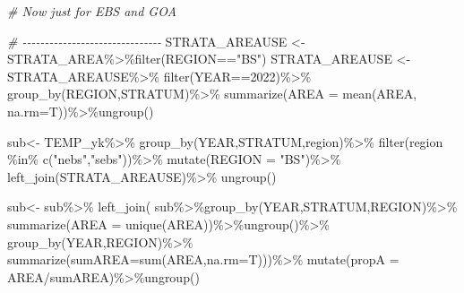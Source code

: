 \documentclass[
]{article}
\newenvironment{Shaded}{\begin{snugshade}}{\end{snugshade}}
\newcommand{\AttributeTok}[1]{\textcolor[rgb]{0.77,0.63,0.00}{#1}}
\newcommand{\CommentTok}[1]{\textcolor[rgb]{0.56,0.35,0.01}{\textit{#1}}}
\newcommand{\DecValTok}[1]{\textcolor[rgb]{0.00,0.00,0.81}{#1}}
\newcommand{\FunctionTok}[1]{\textcolor[rgb]{0.00,0.00,0.00}{#1}}
\newcommand{\NormalTok}[1]{#1}
\newcommand{\OtherTok}[1]{\textcolor[rgb]{0.56,0.35,0.01}{#1}}
\newcommand{\SpecialCharTok}[1]{\textcolor[rgb]{0.00,0.00,0.00}{#1}}
\newcommand{\StringTok}[1]{\textcolor[rgb]{0.31,0.60,0.02}{#1}}
\begin{document}
\begin{Shaded}
\begin{Highlighting}[]
  \CommentTok{\# Now just for EBS and GOA}
  
  \CommentTok{\# {-}{-}{-}{-}{-}{-}{-}{-}{-}{-}{-}{-}{-}{-}{-}{-}{-}{-}{-}{-}{-}{-}{-}{-}{-}{-}{-}{-}{-}{-}{-}}
\NormalTok{        STRATA\_AREAUSE }\OtherTok{\textless{}{-}}\NormalTok{ STRATA\_AREA}\SpecialCharTok{\%\textgreater{}\%}\FunctionTok{filter}\NormalTok{(REGION}\SpecialCharTok{==}\StringTok{"BS"}\NormalTok{)}
\NormalTok{        STRATA\_AREAUSE }\OtherTok{\textless{}{-}}\NormalTok{ STRATA\_AREAUSE}\SpecialCharTok{\%\textgreater{}\%}
          \FunctionTok{filter}\NormalTok{(YEAR}\SpecialCharTok{==}\DecValTok{2022}\NormalTok{)}\SpecialCharTok{\%\textgreater{}\%}
          \FunctionTok{group\_by}\NormalTok{(REGION,STRATUM)}\SpecialCharTok{\%\textgreater{}\%}
          \FunctionTok{summarize}\NormalTok{(}\AttributeTok{AREA =} \FunctionTok{mean}\NormalTok{(AREA, }\AttributeTok{na.rm=}\NormalTok{T))}\SpecialCharTok{\%\textgreater{}\%}\FunctionTok{ungroup}\NormalTok{()}
  
\NormalTok{  sub}\OtherTok{\textless{}{-}}\NormalTok{ TEMP\_yk}\SpecialCharTok{\%\textgreater{}\%}
    \FunctionTok{group\_by}\NormalTok{(YEAR,STRATUM,region)}\SpecialCharTok{\%\textgreater{}\%}
    \FunctionTok{filter}\NormalTok{(region }\SpecialCharTok{\%in\%} \FunctionTok{c}\NormalTok{(}\StringTok{"nebs"}\NormalTok{,}\StringTok{"sebs"}\NormalTok{))}\SpecialCharTok{\%\textgreater{}\%}
    \FunctionTok{mutate}\NormalTok{(}\AttributeTok{REGION =} \StringTok{"BS"}\NormalTok{)}\SpecialCharTok{\%\textgreater{}\%}
    \FunctionTok{left\_join}\NormalTok{(STRATA\_AREAUSE)}\SpecialCharTok{\%\textgreater{}\%}
    \FunctionTok{ungroup}\NormalTok{()}
  
\NormalTok{  sub}\OtherTok{\textless{}{-}}\NormalTok{ sub}\SpecialCharTok{\%\textgreater{}\%}
    \FunctionTok{left\_join}\NormalTok{(}
\NormalTok{      sub}\SpecialCharTok{\%\textgreater{}\%}\FunctionTok{group\_by}\NormalTok{(YEAR,STRATUM,REGION)}\SpecialCharTok{\%\textgreater{}\%}
        \FunctionTok{summarize}\NormalTok{(}\AttributeTok{AREA =} \FunctionTok{unique}\NormalTok{(AREA))}\SpecialCharTok{\%\textgreater{}\%}\FunctionTok{ungroup}\NormalTok{()}\SpecialCharTok{\%\textgreater{}\%}
        \FunctionTok{group\_by}\NormalTok{(YEAR,REGION)}\SpecialCharTok{\%\textgreater{}\%}
        \FunctionTok{summarize}\NormalTok{(}\AttributeTok{sumAREA=}\FunctionTok{sum}\NormalTok{(AREA,}\AttributeTok{na.rm=}\NormalTok{T)))}\SpecialCharTok{\%\textgreater{}\%}
    \FunctionTok{mutate}\NormalTok{(}\AttributeTok{propA =}\NormalTok{ AREA}\SpecialCharTok{/}\NormalTok{sumAREA)}\SpecialCharTok{\%\textgreater{}\%}\FunctionTok{ungroup}\NormalTok{()}
    

\end{Highlighting}
\end{Shaded}
\end{document}
